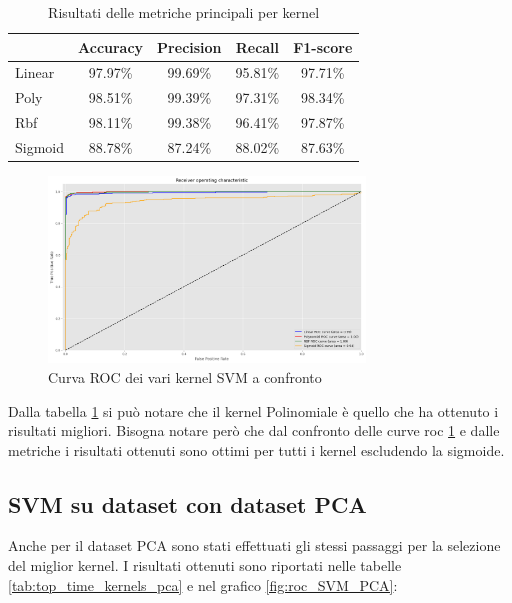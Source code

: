\begin{table}[!ht]
    \centering
    \begin{tabular}{@{}lcccc@{}}
        \toprule
        \rowcolor[HTML]{EFEFEF}
        \multicolumn{1}{c}{\cellcolor[HTML]{EFEFEF}\textbf{kernel}} & \textbf{Accuracy} & \textbf{Precision} & \textbf{Recall} & \textbf{F1-score} \\ \midrule
        Linear                                                      & 97.97\%           & 99.69\%            & 95.81\%         & 97.71\%           \\
        Poly                                                        & 98.51\%           & 99.39\%            & 97.31\%         & 98.34\%           \\
        Rbf                                                         & 98.11\%           & 99.38\%            & 96.41\%         & 97.87\%           \\
        Sigmoid                                                     & 88.78\%           & 87.24\%            & 88.02\%         & 87.63\%           \\ \bottomrule
    \end{tabular}
    \caption{Risultati delle metriche principali per kernel}
    \label{tab:top_metrics_kernels_corr}
\end{table}
\begin{figure}[!ht]
    \centering
    \includegraphics[width=0.75\textwidth]{img/svm/roc_SVM.png}
    \caption{Curva ROC dei vari kernel SVM a confronto}
    \label{fig:roc_SVM_corr}
\end{figure}

Dalla tabella \ref{tab:top_metrics_kernels_corr} si può notare che il kernel Polinomiale
è quello che ha ottenuto i risultati migliori.
Bisogna notare però che dal confronto delle curve roc \ref{fig:roc_SVM_corr} e
dalle metriche i risultati ottenuti sono ottimi per tutti
i kernel escludendo la sigmoide.
\subsection{SVM su dataset con dataset PCA}
Anche per il dataset PCA sono stati effettuati gli stessi passaggi per la
selezione del miglior kernel. I risultati ottenuti sono riportati nelle tabelle
\ref{tab:top_time_kernels_pca} e nel grafico \ref{fig:roc_SVM_PCA}:


